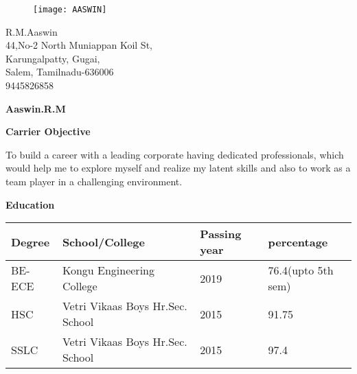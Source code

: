 \documentclass[a4paper,12pt,final]{memoir}
\newcommand{\Sep}{\vspace{1.5em}}
\newcommand{\SmallSep}{\vspace{0.5em}}
\newcommand{\CVSection}[1]
	{\Large\textbf{#1}\par
	\SmallSep\normalsize\normalfont}
\newcommand{\CVItem}[1]
	{\textbf{\color{RoyalBlue} #1}}
\begin{document}
\begin{figure}
	\hfill
	\texttt{[image: AASWIN]}
	\vspace{-7cm}
\end{figure}

\begin{flushright}\small
	R.M.Aaswin \\
	44,No-2 North Muniappan Koil St,\\
	Karungalpatty, Gugai, \\
	Salem, Tamilnadu-636006\\
	9445826858    
\end{flushright}\normalsize
\framebreak


\Huge\bfseries {\color{RoyalBlue} Aaswin.R.M} \\

\normalsize\normalfont


\CVSection{Carrier Objective}
To build a career with a leading corporate having dedicated professionals, which would help me to explore myself and realize my latent skills and also to work as a team player in a challenging environment.
\SmallSep


\Sep

\CVSection{Education}
\begin{tabular}{ | l | l | l | l |}
    \hline
     Degree & School/College & Passing year & percentage\\
     \hline
     BE-ECE & Kongu Engineering College & 2019 & 76.4(upto 5th sem)\\
     \hline
     HSC & Vetri Vikaas Boys Hr.Sec. School & 2015 & 91.75\\
     \hline
     SSLC & Vetri Vikaas Boys Hr.Sec. School & 2015 & 97.4\\
     \hline
     
\end{tabular}
\end{document}
